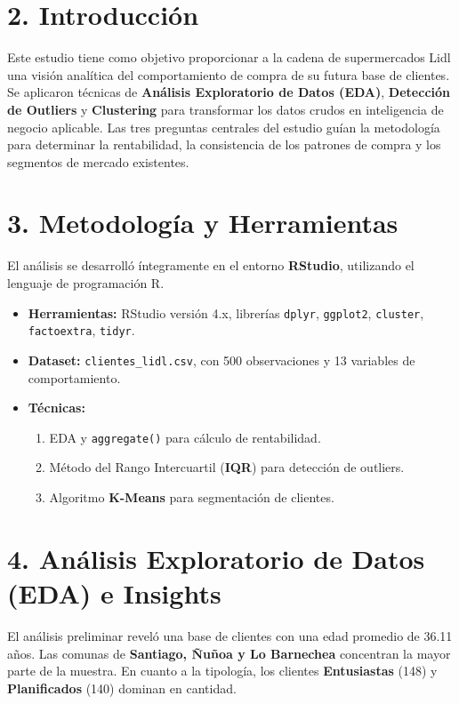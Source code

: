 \documentclass[12pt,a4paper]{article}
\begin{document}
\section*{2. Introducción}
Este estudio tiene como objetivo proporcionar a la cadena de supermercados Lidl una visión analítica del comportamiento de compra de su futura base de clientes. Se aplicaron técnicas de \textbf{Análisis Exploratorio de Datos (EDA)}, \textbf{Detección de Outliers} y \textbf{Clustering} para transformar los datos crudos en inteligencia de negocio aplicable. Las tres preguntas centrales del estudio guían la metodología para determinar la rentabilidad, la consistencia de los patrones de compra y los segmentos de mercado existentes.

\section*{3. Metodología y Herramientas}
El análisis se desarrolló íntegramente en el entorno \textbf{RStudio}, utilizando el lenguaje de programación R.
\begin{itemize}
    \item \textbf{Herramientas:} RStudio versión 4.x, librerías \texttt{dplyr}, \texttt{ggplot2}, \texttt{cluster}, \texttt{factoextra}, \texttt{tidyr}.
    \item \textbf{Dataset:} \texttt{clientes\_lidl.csv}, con 500 observaciones y 13 variables de comportamiento.
    \item \textbf{Técnicas:}
    \begin{enumerate}
        \item EDA y \texttt{aggregate()} para cálculo de rentabilidad.
        \item Método del Rango Intercuartil (\textbf{IQR}) para detección de outliers.
        \item Algoritmo \textbf{K-Means} para segmentación de clientes.
    \end{enumerate}
\end{itemize}

\section*{4. Análisis Exploratorio de Datos (EDA) e Insights}
El análisis preliminar reveló una base de clientes con una edad promedio de 36.11 años. Las comunas de \textbf{Santiago, Ñuñoa y Lo Barnechea} concentran la mayor parte de la muestra. En cuanto a la tipología, los clientes \textbf{Entusiastas} (148) y \textbf{Planificados} (140) dominan en cantidad.
\end{document}
